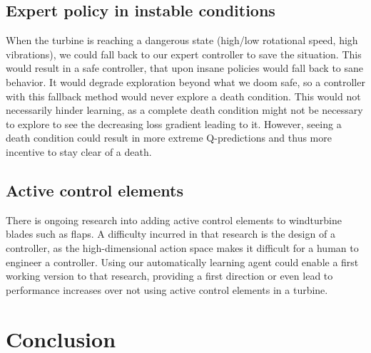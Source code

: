 \documentclass[hyperref,german,beleg]{cgvpub}
\begin{document}
\section{Expert policy in instable conditions}
When the turbine is reaching a dangerous state (high/low rotational speed, high vibrations), we could fall back to our expert controller to save the situation. This would result in a safe controller, that upon insane policies would fall back to sane behavior. It would degrade exploration beyond what we doom safe, so a controller with this fallback method would never explore a death condition. This would not necessarily hinder learning, as a complete death condition might not be necessary to explore to see the decreasing loss gradient leading to it. However, seeing a death condition could result in more extreme Q-predictions and thus more incentive to stay clear of a death.

\section{Active control elements}
There is ongoing research into adding active control elements to windturbine blades such as flaps. A difficulty incurred in that research is the design of a controller, as the high-dimensional action space makes it difficult for a human to engineer a controller. Using our automatically learning agent could enable a first working version to that research, providing a first direction or even lead to performance increases over not using active control elements in a turbine.

\chapter{Conclusion}

\end{document}
